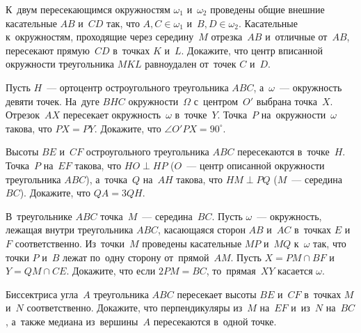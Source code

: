 


\begin{problems}

\item
К~двум пересекающимся окружностям $\omega_{1}$ и~$\omega_{2}$ проведены общие
внешние касательные $AB$ и~$CD$ так, что
$A, C \in \omega_{1}$ и~$B, D \in \omega_{2}$.
Касательные к~окружностям, проходящие через середину~$M$ отрезка~$AB$
и~отличные от~$AB$, пересекают прямую~$CD$ в~точках $K$ и~$L$.
Докажите, что центр вписанной окружности треугольника $MKL$ равноудален
от~точек $C$ и~$D$.

\item
Пусть $H$~--- ортоцентр остроугольного треугольника $ABC$, а~$\omega$~---
окружность девяти точек.
На~дуге $BHC$ окружности~$\Omega$ с~центром~$O'$ выбрана точка~$X$.
Отрезок~$AX$ пересекает окружность~$\omega$ в~точке~$Y$.
Точка~$P$ на~окружности~$\omega$ такова, что $PX = PY$.
Докажите, что $\angle O'PX = 90^\circ$.

\item
Высоты $BE$ и~$CF$ остроугольного треугольника $ABC$ пересекаются в~точке~$H$.
Точка~$P$ на~$EF$ такова, что $HO \perp HP$
($O$~--- центр описанной окружности треугольника $ABC$),
а~точка~$Q$ на~$AH$ такова, что $HM \perp PQ$ ($M$~--- середина~$BC$).
Докажите, что $QA = 3 QH$.

\item
В~треугольнике $ABC$ точка~$M$~--- середина~$BC$.
Пусть $\omega$~--- окружность, лежащая внутри треугольника $ABC$, касающаяся
сторон $AB$ и~$AC$ в~точках $E$ и~$F$ соответственно.
Из~точки~$M$ проведены касательные $MP$ и~$MQ$ к~$\omega$ так, что
точки $P$ и~$B$ лежат по~одну сторону от~прямой~$AM$.
Пусть $X = PM \cap BF $ и~$Y = QM \cap CE $.
Докажите, что если $2 PM = BC$, то~прямая~$XY$ касается $\omega$.

\item
Биссектриса угла~$A$ треугольника $ABC$ пересекает высоты $BE$ и~$CF$
в~точках $M$ и~$N$ соответственно.
Докажите, что перпендикуляры из~$M$ на~$EF$ и~из~$N$ на~$BC$, а~также медиана
из~вершины~$A$ пересекаются в~одной точке.


\end{problems}
